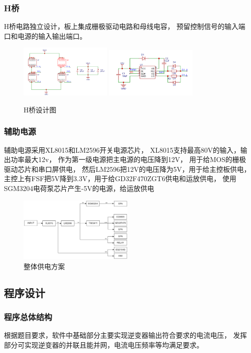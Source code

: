 \documentclass[a4paper,12pt]{article}
\begin{document}
\subsubsection{H桥}
H桥电路独立设计，板上集成栅极驱动电路和母线电容，
预留控制信号的输入端口和电源的输入输出端口。
\begin{figure}[h]
    \centering
    \includegraphics[width=0.4\textwidth]{src/fig6.png}
    \qquad
    \includegraphics[width=0.4\textwidth]{src/fig7.png}
    \caption{H桥设计图}
\end{figure}
\newpage
\subsubsection{辅助电源}
辅助电源采用XL8015和LM2596开关电源芯片，
XL8015支持最高80V的输入，输出功率最大12v，
作为第一级电源把主电源的电压降到12V，
用于给MOS的栅极驱动芯片和串口屏供电，
然后LM2596把12V的电压降为5V，用于给主控板供电，
主控上有FSF把5V降到3.3V，用于给GD32F470ZGT6供电和运放供电，
使用SGM3204电荷泵芯片产生-5V的电源，给运放供电
\begin{figure}[h]
    \centering
    \includegraphics[width=0.5\textwidth]{src/fig2.png}
    \caption{整体供电方案}
    \end{figure}
\subsection{程序设计}

\subsubsection{程序总体结构}
根据题目要求，软件中基础部分主要实现逆变器输出符合要求的电流电压，
发挥部分可实现逆变器的并联且能并网，电流电压频率等均满足要求。
\end{document}
